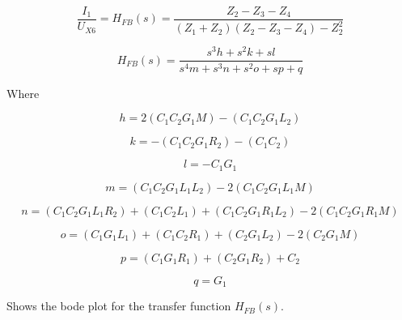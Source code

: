 \begin{equation} \label{eq:fb_1}
\frac{I_1}{U_{X6}} = H_{FB}(s) = \frac{Z_2-Z_3-Z_4}{(Z_1+Z_2)(Z_2-Z_3-Z_4)-Z_2^2}
\end{equation}

\begin{equation} \label{eq:fb_2}
    H_{FB}(s) = \frac{s^3 h + s^2 k + s l}{s^4 m + s^3 n + s^2 o + s p + q}
\end{equation}

Where

\begin{equation}
    h = 2(C_1 C_2 G_1 M) - (C_1 C_2 G_1 L_2)
\end{equation}

\begin{equation}
    k = -(C_1 C_2 G_1 R_2) - (C_1 C_2)
\end{equation}

\begin{equation}
    l = -C_1 G_1
\end{equation}

\begin{equation}
    m = (C_1 C_2 G_1 L_1 L_2)-2(C_1 C_2 G_1 L_1 M)
\end{equation}

\begin{equation} \label{eq:fb_n}
    n = (C_1 C_2 G_1 L_1 R_2) + (C_1 C_2 L_1) + (C_1 C_2 G_1 R_1 L_2) - 2(C_1 C_2 G_1 R_1 M)
\end{equation}

\begin{equation} \label{eq:fb_o}
    o = (C_1 G_1 L_1) + (C_1 C_2 R_1) + (C_2 G_1 L_2) -2(C_2 G_1 M)
\end{equation}

\begin{equation} \label{eq:fb_p}
    p = (C_1 G_1 R_1) + (C_2 G_1 R_2) + C_2
\end{equation}

\begin{equation} \label{eq:fb_q}
    q = G_1
\end{equation}

 Shows the bode plot for the transfer function $H_{FB}(s)$.


